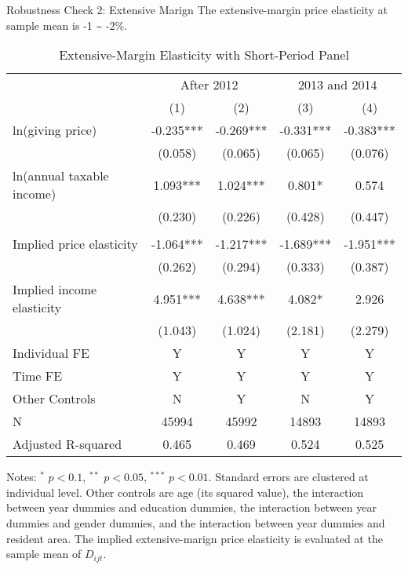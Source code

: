 \documentclass[
  ignorenonframetext,
  aspectratio=169,
]{beamer}
\begin{document}
\begin{frame}{Robustness Check 2: Extensive Marign}
\protect\hypertarget{robustness-check-2-extensive-marign}{}
The extensive-margin price elasticity at sample mean is -1 \textasciitilde{} -2\%.

\begin{table}

\caption{\label{tab:ShortExtensive}Extensive-Margin Elasticity with Short-Period Panel}
\centering
\fontsize{7}{9}\selectfont
\begin{threeparttable}
\begin{tabular}[t]{lcccc}
\toprule
\multicolumn{1}{c}{ } & \multicolumn{2}{c}{After 2012} & \multicolumn{2}{c}{2013 and 2014} \\
\cmidrule(l{3pt}r{3pt}){2-3} \cmidrule(l{3pt}r{3pt}){4-5}
 & (1) & (2) & (3) & (4)\\
\midrule
ln(giving price) & -0.235*** & -0.269*** & -0.331*** & -0.383***\\
 & (0.058) & (0.065) & (0.065) & (0.076)\\
ln(annual taxable income) & 1.093*** & 1.024*** & 0.801* & 0.574\\
 & (0.230) & (0.226) & (0.428) & (0.447)\\
 &  &  &  & \\
Implied price elasticity & -1.064*** & -1.217*** & -1.689*** & -1.951***\\
 & (0.262) & (0.294) & (0.333) & (0.387)\\
Implied income elasticity & 4.951*** & 4.638*** & 4.082* & 2.926\\
 & (1.043) & (1.024) & (2.181) & (2.279)\\
Individual FE & Y & Y & Y & Y\\
Time FE & Y & Y & Y & Y\\
Other Controls & N & Y & N & Y\\
N & 45994 & 45992 & 14893 & 14893\\
Adjusted R-squared & 0.465 & 0.469 & 0.524 & 0.525\\
\bottomrule
\end{tabular}
\begin{tablenotes}
\item Notes: $^{*}$ $p < 0.1$, $^{**}$ $p < 0.05$, $^{***}$ $p < 0.01$. Standard errors are clustered at individual level. Other controls are age (its squared value), the interaction between year dummies and education dummies, the interaction between year dummies and gender dummies, and the interaction between year dummies and resident area. The implied extensive-marign price elasticity is evaluated at the sample mean of $D_{ijt}$.
\end{tablenotes}
\end{threeparttable}
\end{table}
\end{frame}
\end{document}
